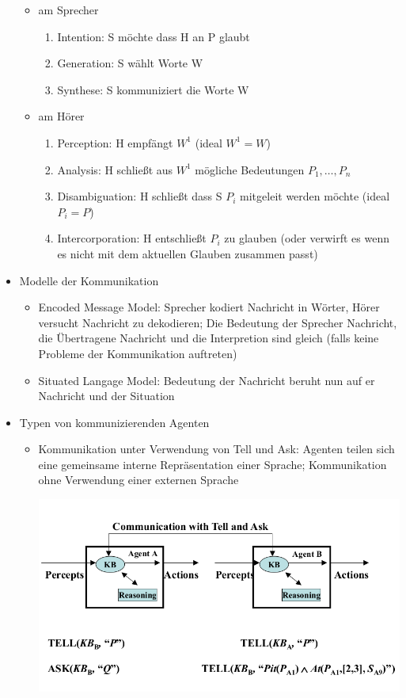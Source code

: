 \documentclass{article} %
\begin{document}
\begin{itemize}
\begin{itemize}
			\item am Sprecher
			\begin{enumerate}
				\item Intention: S möchte dass H an P glaubt
				\item Generation: S wählt Worte W
				\item Synthese: S kommuniziert die Worte W
			\end{enumerate}
			\item am Hörer
			\begin{enumerate}
				\item Perception: H empfängt $W^1$ (ideal $W^1 = W$)
				\item Analysis: H schließt aus $W^1$ mögliche Bedeutungen $P_1,\dots,P_n$
				\item Disambiguation: H schließt dass S $P_i$ mitgeleit werden möchte (ideal $P_i = P$)
				\item Intercorporation: H entschließt $P_i$ zu glauben (oder verwirft es wenn es nicht mit dem aktuellen Glauben zusammen passt)
			\end{enumerate}
		\end{itemize}
		\item Modelle der Kommunikation
		\begin{itemize}
			\item Encoded Message Model: Sprecher kodiert Nachricht in Wörter, Hörer versucht Nachricht zu dekodieren; Die Bedeutung der Sprecher Nachricht, die Übertragene Nachricht und die Interpretion sind gleich (falls keine Probleme der Kommunikation auftreten)
			\item Situated Langage Model: Bedeutung der Nachricht beruht nun auf er Nachricht und der Situation
		\end{itemize}
		\item Typen von kommunizierenden Agenten
		\begin{itemize}
			\item Kommunikation unter Verwendung von Tell und Ask: Agenten teilen sich eine gemeinsame interne Repräsentation einer Sprache; Kommunikation ohne Verwendung einer externen Sprache
			\begin{center}
				\includegraphics[scale=0.3]{img/tell and ask.png}

\end{center}
\end{itemize}
\end{itemize}
\end{document}
